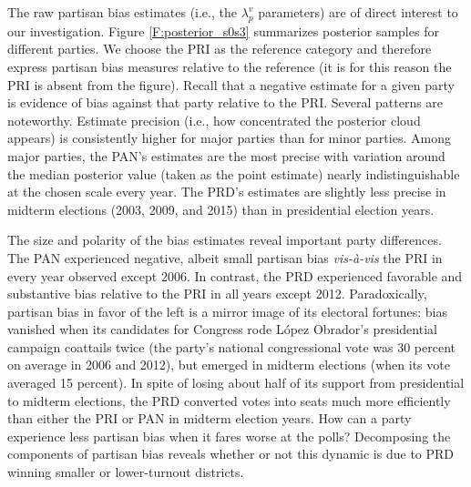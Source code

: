 \documentclass[letter,12pt]{article}
\begin{document}
{%

The raw partisan bias estimates (i.e., the $\lambda_p^v$ parameters) are of direct interest to our investigation. Figure \ref{F:posterior_s0s3} summarizes posterior samples for different parties. We choose the PRI as the reference category and therefore express partisan bias measures relative to the reference (it is for this reason the PRI is absent from the figure). Recall that a negative estimate for a given party is evidence of bias against that party relative to the PRI. Several patterns are noteworthy. Estimate precision (i.e., how concentrated the posterior cloud appears) is consistently higher for major parties than for minor parties. Among major parties, the PAN's estimates are the most precise with variation around the median posterior value (taken as the point estimate) nearly indistinguishable at the chosen scale every year. The PRD's estimates are slightly less precise in midterm elections (2003, 2009, and 2015) than in presidential election years.  

The size and polarity of the bias estimates reveal important party differences. The PAN experienced negative, albeit small partisan bias \emph{vis-\`a-vis} the PRI in every year observed except 2006. In contrast, the PRD experienced favorable and substantive bias relative to the PRI in all years except 2012. Paradoxically, partisan bias in favor of the left is a mirror image of its electoral fortunes: bias vanished when its candidates for Congress rode L\'opez Obrador's presidential campaign coattails twice (the party's national congressional vote was 30 percent on average in 2006 and 2012), but emerged in midterm elections (when its vote averaged 15 percent). In spite of losing about half of its support from presidential to midterm elections, the PRD converted votes into seats much more efficiently than either the PRI or PAN in midterm election years. How can a party experience less partisan bias when it fares worse at the polls? Decomposing the components of partisan bias reveals whether or not this dynamic is due to PRD winning smaller or lower-turnout districts.


}
\end{document}
